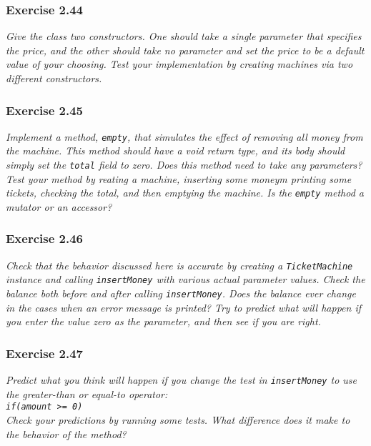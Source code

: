 \subsubsection*{Exercise 2.44}
\textit{Give the class two constructors. One should take a single parameter 
that specifies the price, and the other should take no parameter and set the 
price to be a default value of your choosing. Test your implementation by 
creating machines via two different constructors. }\\

\subsubsection*{Exercise 2.45}
\textit{Implement a method, \lstinline?empty?, that simulates the effect of 
removing all money from the machine. This method should have a void return 
type, and its body should simply set the \lstinline?total? field to zero. Does 
this method need to take any parameters? Test your method by reating a 
machine, inserting some moneym printing some tickets, checking the total, and 
then emptying the machine. Is the \lstinline?empty? method a mutator or an 
accessor? }\\

\subsubsection*{Exercise 2.46}
\textit{Check that the behavior discussed here is accurate by creating a 
\lstinline?TicketMachine? instance and calling \lstinline?insertMoney? with 
various actual parameter values. Check the balance both before and after 
calling \lstinline?insertMoney?. Does the balance ever change in the cases 
when an error message is printed? Try to predict what will happen if you enter 
the value zero as the parameter, and then see if you are right. }\\

\subsubsection*{Exercise 2.47}
\textit{Predict what you think will happen if you change the test in 
\lstinline?insertMoney? to use the greater-than or equal-to operator: \\
\lstinline?if(amount >= 0)?\\
Check your predictions by running some tests. What difference does it make to 
the behavior of the method? }\\

